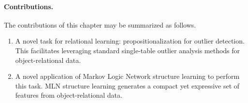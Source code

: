 		\paragraph{Contributions.} The contributions of this chapter may be summarized as follows. 
		
		\begin{enumerate}
			\item A novel task for relational learning: propositionalization for outlier detection. This facilitates leveraging standard single-table outlier analysis methods for object-relational data.
			\item A novel application of Markov Logic Network structure learning to perform this task. MLN structure learning generates a compact yet expressive set of features from object-relational data.
		\end{enumerate}
%			
%			
%			
